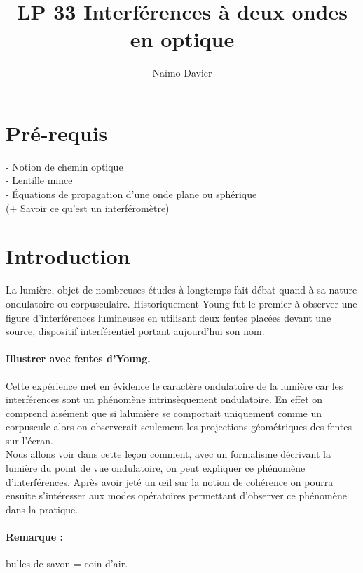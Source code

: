 \documentclass[12pt,prb,aps,epsf]{report}
\begin{document}
	
	\title{LP 33 Interférences à deux ondes en optique}
	\author{Naïmo Davier}
	
	\maketitle
	
	\tableofcontents
	
	\pagebreak

\section{Pré-requis}
	- Notion de chemin optique\\
	- Lentille mince\\
	- Équations de propagation d'une onde plane ou sphérique\\
	(+ Savoir ce qu'est un interféromètre)
	
\section{Introduction}
La lumière, objet de nombreuses études à longtemps fait débat quand à sa nature ondulatoire ou corpusculaire. Historiquement Young fut le premier à observer une figure d'interférences lumineuses en utilisant deux fentes placées devant une source, dispositif interférentiel portant aujourd'hui son nom. 
\paragraph{Illustrer avec fentes d'Young.}
Cette expérience met en évidence le caractère ondulatoire de la lumière car les interférences sont un phénomène intrinsèquement ondulatoire. En effet on comprend aisément que si lalumière se comportait uniquement comme un corpuscule alors on observerait seulement les projections géométriques des fentes sur l'écran.\\ 

Nous allons voir dans cette leçon comment, avec un formalisme décrivant la lumière du point de vue ondulatoire, on peut expliquer ce phénomène d'interférences. Après avoir jeté un œil sur la notion de cohérence on pourra ensuite s'intéresser aux modes opératoires permettant d'observer ce phénomène dans la pratique.
\paragraph{Remarque :} bulles de savon = coin d'air.
\end{document}
